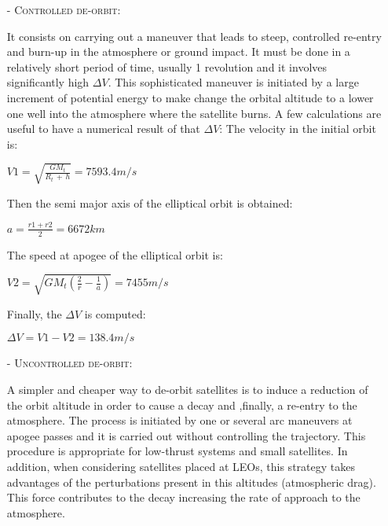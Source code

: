 \begin{itemize}

\item[-] \textsc{Controlled de-orbit:}

It consists on carrying out a maneuver that leads to steep, controlled re-entry and burn-up in the atmosphere or ground impact. It must be done in a relatively short period of time, usually 1 revolution and it involves significantly high $\Delta V$. This sophisticated maneuver is initiated by a large increment of potential energy to make change the orbital altitude to a lower one well into the atmosphere where the satellite burns. A few calculations are useful to have a numerical result of that  $\Delta V$:
The velocity in the initial orbit is: 
\newline
\begin{center}
$V1 = \sqrt{\frac{GM_t}{R_t\,+\,h}}  = 7593.4 m/s$
\newline
\end{center}
Then the semi major axis of the elliptical orbit is obtained: 
\newline
\begin{center}
$a = {\frac{r1+r2}{2}} = 6672 km$
\newline
\end{center}
The speed at apogee of the elliptical orbit is: 
\newline
\begin{center}
$V2 = \sqrt{GM_t(\frac{2}{r}-\frac{1}{a})} = 7455 m/s$
\newline
\end{center}
Finally, the $\Delta V$ is computed: 
\newline
\begin{center}
$\Delta V = V1-V2 = 138.4 m/s$
\end{center}

\item[-]  \textsc{Uncontrolled de-orbit:}

A simpler and cheaper way to de-orbit satellites is to induce a reduction of the orbit altitude in order to cause a decay and ,finally, a re-entry to the atmosphere. The process is initiated by one or several arc maneuvers at apogee passes and it is carried out without controlling the trajectory. This procedure is appropriate for low-thrust systems and small satellites. 
\newline
In addition, when considering satellites placed at LEOs, this strategy takes advantages of the perturbations present in this altitudes (atmospheric drag). This force contributes to the decay increasing the rate of approach to the atmosphere. 

\end{itemize}